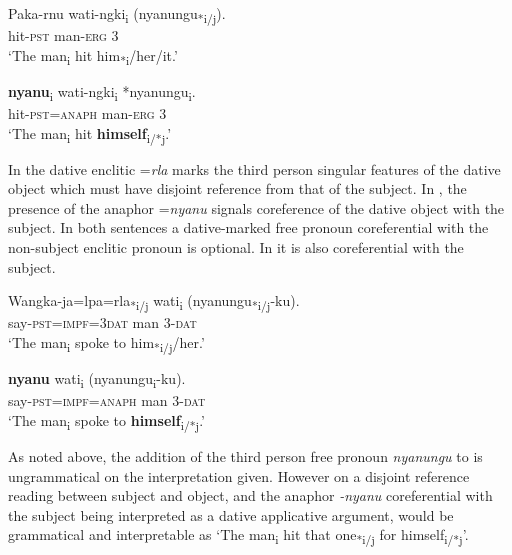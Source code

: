 \documentclass[output=paper]{../langscibook}
\begin{document}
\ea%
    \label{ex:laughren:10}
\ea
\label{ex:laughren:10a}
\gll Paka-rnu  wati-ngki\textsubscript{i} ({nyanungu}\textsubscript{*i/j}).\\
    hit-\textsc{pst}  man-\textsc{erg}  3\\
\glt `The man\textsubscript{i} hit him\textsubscript{*i}/her/it.'

\ex
\label{ex:laughren:10b}
\textbf{nyanu}{\textsubscript{i}} {wati-ngki\textsubscript{i} }*{nyanungu\textsubscript{i}}.\\
    hit-\textsc{pst=anaph}  man-\textsc{erg}  3\\
\glt `The man\textsubscript{i} hit \textbf{himself}\textsubscript{i/*j}.'
\z
\z


In  the dative enclitic =\textit{rla} marks the third person singular features of the dative object which must have disjoint reference from that of the subject. In , the presence of the anaphor =\textit{nyanu} signals coreference of the dative object with the subject. In both sentences a dative-marked free pronoun coreferential with the non-subject enclitic pronoun is optional. In  it is also coreferential with the subject.

\ea%
    \label{ex:laughren:11}
\ea
\label{ex:laughren:11a}
\gll Wangka-ja=lpa=rla\textsubscript{*i/j} {wati\textsubscript{i}} ({nyanungu\textsubscript{*i/j}}{{}-ku}).\\
    say-\textsc{pst=}\textsc{impf=3dat}  man  3-\textsc{dat}\\
\glt `The man\textsubscript{i} spoke to him\textsubscript{*i/j}/her.'

\ex
\label{ex:laughren:11b}
\textbf{{nyanu}} {wati\textsubscript{i}} ({nyanungu\textsubscript{i}}{{}-ku}).\\
    say-\textsc{pst=impf=anaph}  man  3-\textsc{dat}\\
\glt `The man\textsubscript{i} spoke to \textbf{himself}\textsubscript{i/*j}.'
\z
\z


As noted above, the addition of the third person free pronoun \textit{nyanungu} to  is ungrammatical on the interpretation given. However on a disjoint reference reading between subject and object, and the anaphor \textit{{}-nyanu} coreferential with the subject being interpreted as a dative applicative argument,  would be grammatical and interpretable as `The man\textsubscript{i} hit that one\textsubscript{*i/j} for himself\textsubscript{i/*j}{}'.
\end{document}
